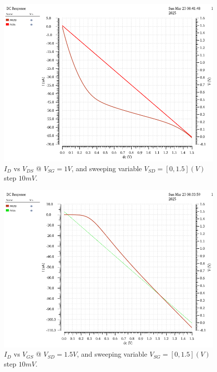 
\begin{figure}[H]
	\centering
	\includegraphics[width=0.6\linewidth]{sections/pic/EX1_PMOS_Id&Vds(Vgs1).png}
	\caption{$I_D$ vs $V_{DS}$ @ $V_{SG} = 1V$, and sweeping variable $V_{SD} = [0, 1.5](V)$ step $10mV$.}
	\label{f_EX1_PMOS_Id&Vds(Vgs1)}
\end{figure}


\begin{figure}[H]
	\centering
	\includegraphics[width=0.6\linewidth]{sections/pic/EX1_PMOS_Id&Vgs(Vds15).png}
	\caption{$I_D$ vs $V_{GS}$ @ $V_{SD} = 1.5V$, and sweeping variable $V_{SG} = [0, 1.5](V)$ step $10mV$.}
	\label{f_EX1_PMOS_Id&Vgs(Vds15)}
\end{figure}

